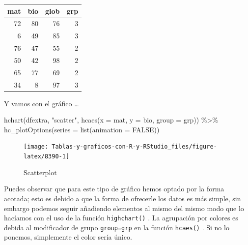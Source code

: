 \documentclass[
]{book}
\newenvironment{Shaded}{\begin{snugshade}}{\end{snugshade}}
\newcommand{\AttributeTok}[1]{\textcolor[rgb]{0.77,0.63,0.00}{#1}}
\newcommand{\ConstantTok}[1]{\textcolor[rgb]{0.00,0.00,0.00}{#1}}
\newcommand{\FunctionTok}[1]{\textcolor[rgb]{0.00,0.00,0.00}{#1}}
\newcommand{\NormalTok}[1]{#1}
\newcommand{\SpecialCharTok}[1]{\textcolor[rgb]{0.00,0.00,0.00}{#1}}
\newcommand{\StringTok}[1]{\textcolor[rgb]{0.31,0.60,0.02}{#1}}
\begin{document}
\begin{table}
\centering
\begin{tabular}{r|r|r|r}
\hline
mat & bio & glob & grp\\
\hline
72 & 80 & 76 & 3\\
\hline
6 & 49 & 85 & 3\\
\hline
76 & 47 & 55 & 2\\
\hline
50 & 42 & 98 & 2\\
\hline
65 & 77 & 69 & 2\\
\hline
34 & 8 & 97 & 3\\
\hline
\end{tabular}
\end{table}

Y vamos con el gráfico \ldots{}

\begin{Shaded}
\begin{Highlighting}[]
\FunctionTok{hchart}\NormalTok{(dfextra, }\StringTok{"scatter"}\NormalTok{, }\FunctionTok{hcaes}\NormalTok{(}\AttributeTok{x =}\NormalTok{ mat, }\AttributeTok{y =}\NormalTok{ bio, }\AttributeTok{group =}\NormalTok{ grp)) }\SpecialCharTok{\%\textgreater{}\%}
  \FunctionTok{hc\_plotOptions}\NormalTok{(}\AttributeTok{series =} \FunctionTok{list}\NormalTok{(}\AttributeTok{animation =} \ConstantTok{FALSE}\NormalTok{))}
\end{Highlighting}
\end{Shaded}

\begin{figure}[H]

{\centering \texttt{[image: Tablas-y-graficos-con-R-y-RStudio\_files/figure-latex/8390-1]} 

}

\caption{Scatterplot}\label{fig:8390}
\end{figure}

Puedes observar que para este tipo de gráfico hemos optado por la forma acotada; esto es debido a que la forma de ofrecerle los datos es más simple, sin embargo podemos seguir añadiendo elementos al mismo del mismo modo que lo hacíamos con el uso de la función \texttt{highchart()} . La agrupación por colores es debida al modificador de grupo \texttt{group=grp} en la función \texttt{hcaes()} . Si no lo ponemos, simplemente el color sería único.
\end{document}

